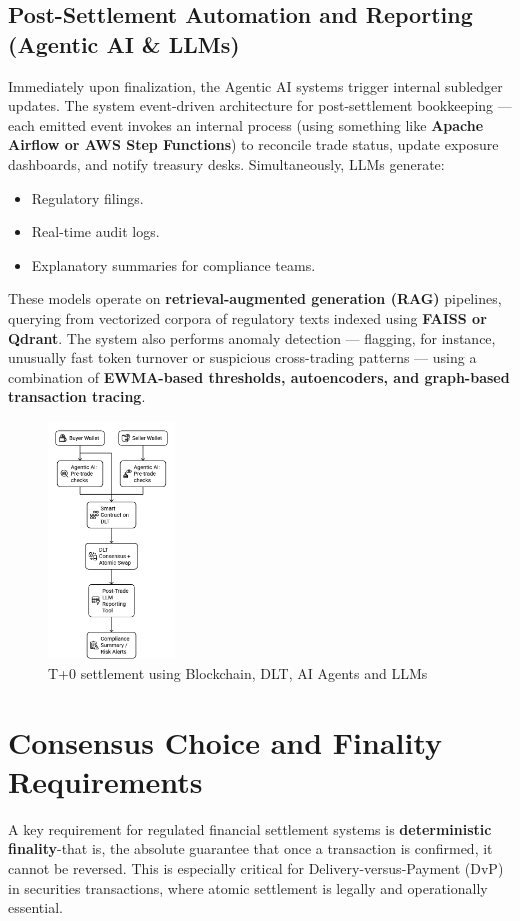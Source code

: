 \documentclass[conference]{IEEEtran}
\begin{document}
\subsection{Post-Settlement Automation and Reporting (Agentic AI \& LLMs)}
Immediately upon finalization, the Agentic AI systems trigger internal subledger updates. The system event-driven architecture for post-settlement bookkeeping — each emitted event invokes an internal process (using something like \textbf{Apache Airflow or AWS Step Functions}) to reconcile trade status, update exposure dashboards, and notify treasury desks.
Simultaneously, LLMs generate:
\begin{itemize}
    \item Regulatory filings.
    \item Real-time audit logs.
    \item Explanatory summaries for compliance teams.
\end{itemize}
These models operate on \textbf{retrieval-augmented generation (RAG)} pipelines, querying from vectorized corpora of regulatory texts indexed using \textbf{FAISS or Qdrant}. The system also performs anomaly detection — flagging, for instance, unusually fast token turnover or suspicious cross-trading patterns — using a combination of \textbf{EWMA-based thresholds, autoencoders, and graph-based transaction tracing}.
\begin{figure}[H]
    \centering
    \includegraphics[width=0.3\textwidth]{3.png}
    \caption{T+0 settlement using Blockchain, DLT, AI Agents and LLMs}
    \label{fig:settlement_timeline}
\end{figure}
\section{Consensus Choice and Finality Requirements}
A key requirement for regulated financial settlement systems is \textbf{deterministic finality}-that is, the absolute guarantee that once a transaction is confirmed, it cannot be reversed. This is especially critical for Delivery-versus-Payment (DvP) in securities transactions, where atomic settlement is legally and operationally essential\cite{b4}.
\end{document}
